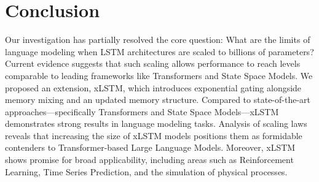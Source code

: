 \section{Conclusion}
Our investigation has partially resolved the core question: What are the limits of language modeling when LSTM architectures are scaled to billions of parameters? Current evidence suggests that such scaling allows performance to reach levels comparable to leading frameworks like Transformers and State Space Models. We proposed an extension, xLSTM, which introduces exponential gating alongside memory mixing and an updated memory structure. Compared to state-of-the-art approaches—specifically Transformers and State Space Models—xLSTM demonstrates strong results in language modeling tasks. Analysis of scaling laws reveals that increasing the size of xLSTM models positions them as formidable contenders to Transformer-based Large Language Models. Moreover, xLSTM shows promise for broad applicability, including areas such as Reinforcement Learning, Time Series Prediction, and the simulation of physical processes.

